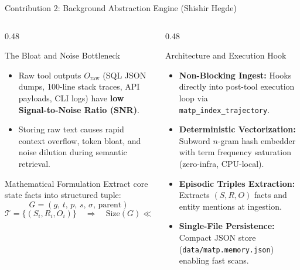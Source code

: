 \documentclass[aspectratio=169,10pt]{beamer}
\begin{document}
\begin{frame}{Contribution 2: Background Abstraction Engine (Shishir Hegde)}
  \begin{columns}[T,onlytextwidth]
    \begin{column}{0.48\textwidth}
      \begin{block}{The Bloat and Noise Bottleneck}
        \begin{itemize}
          \footnotesize
          \item Raw tool outputs $O_{\mathrm{raw}}$ (SQL JSON dumps, 100-line stack traces, API payloads, CLI logs) have \textbf{low Signal-to-Noise Ratio (SNR)}.
          \item Storing raw text causes rapid context overflow, token bloat, and noise dilution during semantic retrieval.
        \end{itemize}
      \end{block}
      \begin{block}{Mathematical Formulation}
        \footnotesize
        Extract core state facts into structured tuple:
        \[
          G = (g,\, t,\, p,\, s,\, \sigma,\, \text{parent})
        \]
        \[
          \mathcal{T} = \{(S_i, R_i, O_i)\} \quad \Longrightarrow \quad \mathrm{Size}(G) \ll \mathrm{Size}(O_{\mathrm{raw}})
        \]
      \end{block}
    \end{column}
    \begin{column}{0.48\textwidth}
      \begin{block}{Architecture and Execution Hook}
        \begin{itemize}
          \footnotesize
          \item \textbf{Non-Blocking Ingest:} Hooks directly into post-tool execution loop via \texttt{matp\_index\_trajectory}.
          \item \textbf{Deterministic Vectorization:} Subword $n$-gram hash embedder with term frequency saturation (zero-infra, CPU-local).
          \item \textbf{Episodic Triples Extraction:} Extracts $(S, R, O)$ facts and entity mentions at ingestion.
          \item \textbf{Single-File Persistence:} Compact JSON store (\texttt{data/matp.memory.json}) enabling fast scans.
        \end{itemize}
      \end{block}
    \end{column}
  \end{columns}
\end{frame}
\end{document}
